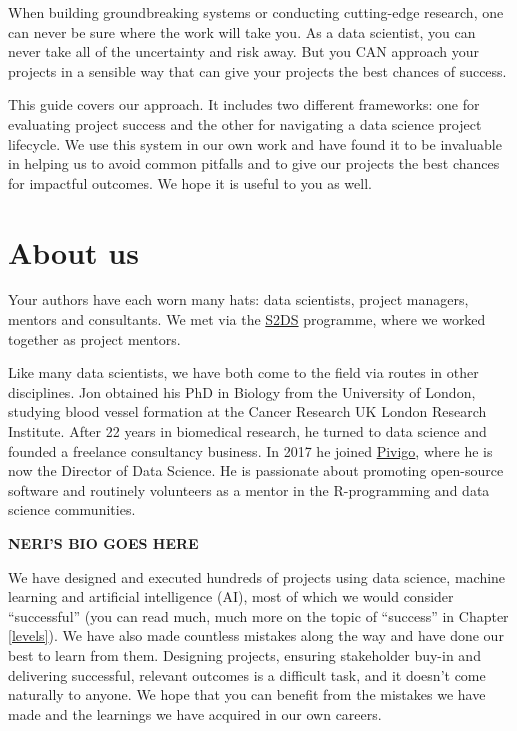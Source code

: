 \documentclass[
]{book}
\begin{document}
When building groundbreaking systems or conducting cutting-edge research, one can never be sure where the work will take you. As a data scientist, you can never take all of the uncertainty and risk away. But you CAN approach your projects in a sensible way that can give your projects the best chances of success.

This guide covers our approach. It includes two different frameworks: one for evaluating project success and the other for navigating a data science project lifecycle. We use this system in our own work and have found it to be invaluable in helping us to avoid common pitfalls and to give our projects the best chances for impactful outcomes. We hope it is useful to you as well.

\hypertarget{about-us}{%
\section*{About us}\label{about-us}}

Your authors have each worn many hats: data scientists, project managers, mentors and consultants. We met via the \href{http://www.s2ds.org/}{S2DS} programme, where we worked together as project mentors.

Like many data scientists, we have both come to the field via routes in other disciplines. Jon obtained his PhD in Biology from the University of London, studying blood vessel formation at the Cancer Research UK London Research Institute. After 22 years in biomedical research, he turned to data science and founded a freelance consultancy business. In 2017 he joined \href{https://www.pivigo.com}{Pivigo}, where he is now the Director of Data Science. He is passionate about promoting open-source software and routinely volunteers as a mentor in the R-programming and data science communities.

\textbf{NERI'S BIO GOES HERE}

We have designed and executed hundreds of projects using data science, machine learning and artificial intelligence (AI), most of which we would consider ``successful'' (you can read much, much more on the topic of ``success'' in Chapter \ref{levels}). We have also made countless mistakes along the way and have done our best to learn from them. Designing projects, ensuring stakeholder buy-in and delivering successful, relevant outcomes is a difficult task, and it doesn't come naturally to anyone. We hope that you can benefit from the mistakes we have made and the learnings we have acquired in our own careers.
\end{document}

